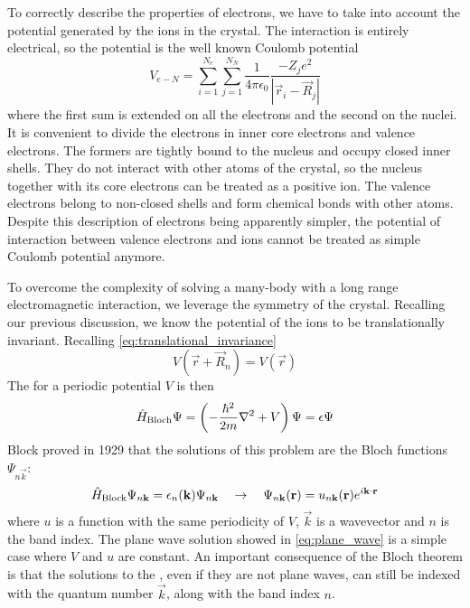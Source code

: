 To correctly describe the properties of electrons, we have to take into account the potential generated by the ions in the crystal. The interaction is entirely electrical, so the potential is the well known Coulomb potential
\begin{equation}
    V_{e-N} = \sum_{i=1}^{N_e} \sum_{j=1}^{N_N} \frac{1}{4\pi\epsilon_0} \frac{-Z_je^2}{|\vec{r}_i - \vec{R}_j|}
\end{equation}
where the first sum is extended on all the electrons and the second on the nuclei. It is convenient to divide the electrons in inner core electrons and valence electrons. The formers are tightly bound to the nucleus and occupy closed inner shells. They do not interact with other atoms of the crystal, so the nucleus together with its core electrons can be treated as a positive ion. The valence electrons belong to  non-closed shells and form chemical bonds with other atoms. Despite this description of electrons being apparently simpler, the potential of interaction between valence electrons and ions cannot be treated as simple Coulomb potential anymore.

To overcome the complexity of solving a many-body \sche   with a long range electromagnetic interaction, we leverage the symmetry of the crystal. Recalling our previous discussion, we know the potential of the ions to be translationally invariant. Recalling \cref{eq:translational_invariance}
\begin{equation}
    V(\vec{r}+\vec{R}_n) = V(\vec{r})
\end{equation}
The \sche for a periodic potential $V$ is then
\begin{equation}
    \oper{H}_\text{Bloch} \Psi = \left(-\frac{\hbar^2}{2m} \laplacian + V \right)\Psi = \epsilon\Psi
\end{equation}
Block proved in 1929 \cite{bloch1929} that the solutions of this problem are the Bloch functions $\Psi_{n\vec{k}}$:
\begin{equation}
    \hat{H}_\text{Block} \Psi_{n\mathbf{k}} = \epsilon_n(\mathbf{k}) \Psi_{n\mathbf{k}}
    \quad
    \rightarrow
    \quad
    \Psi_{n\mathbf{k}}(\mathbf{r}) = u_{n\mathbf{k}}(\mathbf{r}) e^{i\mathbf{k}\cdot\mathbf{r}}
\end{equation}
where $u$ is a function with the same periodicity of $V$, $\vec{k}$ is a wavevector and $n$ is the band index. The plane wave solution showed in \cref{eq:plane_wave} is a simple case where $V$ and $u$ are constant. An important consequence of the Bloch theorem is that the solutions to the \sche, even if they are not plane waves, can still be indexed with the quantum number $\vec{k}$, along with the band index $n$.

